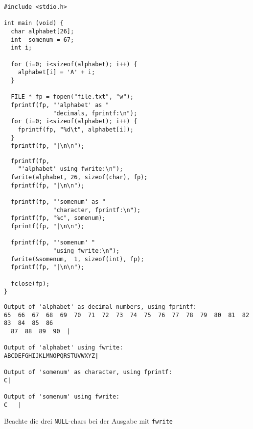 \begin{frame}[fragile]
%
%
\begin{codebox}
\begin{verbatim}
#include <stdio.h>

int main (void) {
  char alphabet[26];
  int  somenum = 67;
  int i;
  
  for (i=0; i<sizeof(alphabet); i++) {
    alphabet[i] = 'A' + i;
  }
  
  FILE * fp = fopen("file.txt", "w");    
  fprintf(fp, "'alphabet' as "
              "decimals, fprintf:\n");
  for (i=0; i<sizeof(alphabet); i++) {
    fprintf(fp, "%d\t", alphabet[i]);
  }
  fprintf(fp, "|\n\n");
\end{verbatim}
\end{codebox}
%
\begin{codebox}[...Fortsetzung]
\begin{verbatim}
  fprintf(fp, 
    "'alphabet' using fwrite:\n");
  fwrite(alphabet, 26, sizeof(char), fp);
  fprintf(fp, "|\n\n");
  
  fprintf(fp, "'somenum' as "
              "character, fprintf:\n");
  fprintf(fp, "%c", somenum);
  fprintf(fp, "|\n\n");
    
  fprintf(fp, "'somenum' "
              "using fwrite:\n");
  fwrite(&somenum,  1, sizeof(int), fp);
  fprintf(fp, "|\n\n");

  fclose(fp);
}
\end{verbatim}
\end{codebox}
%
\end{frame}


\begin{frame}[fragile]
%
\begin{cmdbox}[Dateiausgabe]
\begin{verbatim}
Output of 'alphabet' as decimal numbers, using fprintf:
65  66  67  68  69  70  71  72  73  74  75  76  77  78  79  80  81  82  83  84  85  86
  87  88  89  90  |

Output of 'alphabet' using fwrite:
ABCDEFGHIJKLMNOPQRSTUVWXYZ|

Output of 'somenum' as character, using fprintf:
C|

Output of 'somenum' using fwrite:
C   |
\end{verbatim}
\end{cmdbox}
%
\begin{hintbox}
Beachte die drei \texttt{NULL}-chars bei der Ausgabe mit \texttt{fwrite}
\end{hintbox}
%
\end{frame}

